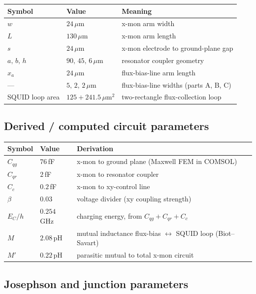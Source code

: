 \documentclass[11pt,a4paper]{article}
\begin{document}
\begin{center}
\begin{tabular}{@{}lll@{}}
\toprule
Symbol & Value & Meaning \\
\midrule
$w$ & $24\,\mu$m & x-mon arm width \\
$L$ & $130\,\mu$m & x-mon arm length \\
$s$ & $24\,\mu$m & x-mon electrode to ground-plane gap \\
$a,\,b,\,h$ & $90,\,45,\,6\,\mu$m & resonator coupler geometry \\
$x_a$ & $24\,\mu$m & flux-bias-line arm length \\
--- & $5,\,2,\,2\,\mu$m & flux-bias-line widths (parts A, B, C) \\
SQUID loop area & $125 + 241.5\,\mu$m$^2$ & two-rectangle flux-collection loop \\
\bottomrule
\end{tabular}
\end{center}

\subsection{Derived / computed circuit parameters}

\begin{center}
\begin{tabular}{@{}lll@{}}
\toprule
Symbol & Value & Derivation \\
\midrule
$C_{qg}$ & $76\,$fF & x-mon to ground plane (Maxwell FEM in COMSOL) \\
$C_{qr}$ & $2\,$fF & x-mon to resonator coupler \\
$C_c$ & $0.2\,$fF & x-mon to xy-control line \\
$\beta$ & $0.03$ & voltage divider (xy coupling strength) \\
$E_C/h$ & $0.254\,$GHz & charging energy, from $C_{qg}+C_{qr}+C_c$ \\
$M$ & $2.08\,$pH & mutual inductance flux-bias $\leftrightarrow$ SQUID loop (Biot--Savart) \\
$M'$ & $0.22\,$pH & parasitic mutual to total x-mon circuit \\
\bottomrule
\end{tabular}
\end{center}

\subsection{Josephson and junction parameters}
\end{document}
